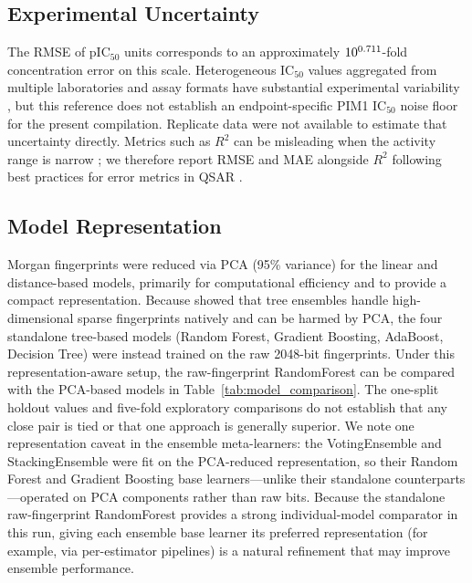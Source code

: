 \documentclass[11pt]{article}
\begin{document}
\subsection{Experimental Uncertainty}

The RMSE of \SelectedHoldoutRMSE{} pIC$_{50}$ units corresponds to an approximately
$10^{0.711{}}$-fold concentration error on this scale. Heterogeneous
IC$_{50}$ values aggregated from multiple laboratories and assay formats have substantial
experimental variability \citep{kramer2012experimental}, but this reference does not establish
an endpoint-specific PIM1 IC$_{50}$ noise floor for the present compilation. Replicate data
were not available to estimate that uncertainty directly.
Metrics such as $R^2$ can be misleading when the activity range is narrow
\citep{alexander2015beware}; we therefore report RMSE and MAE alongside $R^2$
following best practices for error metrics in QSAR \citep{roy2016some}.

\subsection{Model Representation}
\label{sec:representation}

Morgan fingerprints were reduced via PCA (95\% variance) for the linear and distance-based
models, primarily for computational efficiency and to provide a compact representation.
Because \citet{svetnik2003random} showed that tree ensembles handle high-dimensional sparse
fingerprints natively and can be harmed by PCA, the four standalone tree-based models
(Random Forest, Gradient Boosting, AdaBoost, Decision Tree) were instead trained on the raw
2048-bit fingerprints.
Under this representation-aware setup, the raw-fingerprint RandomForest can be compared
with the PCA-based models in Table~\ref{tab:model_comparison}. The one-split holdout values
and five-fold exploratory comparisons do not establish that any close pair is tied or that
one approach is generally superior.
We note one representation caveat in the ensemble meta-learners: the VotingEnsemble and
StackingEnsemble were fit on the PCA-reduced representation, so their Random Forest and
Gradient Boosting base learners---unlike their standalone counterparts---operated on PCA
components rather than raw bits.
Because the standalone raw-fingerprint RandomForest provides a strong individual-model
comparator in this run, giving each ensemble base learner its preferred representation
(for example, via per-estimator pipelines) is a natural refinement that may improve
ensemble performance.
\end{document}
